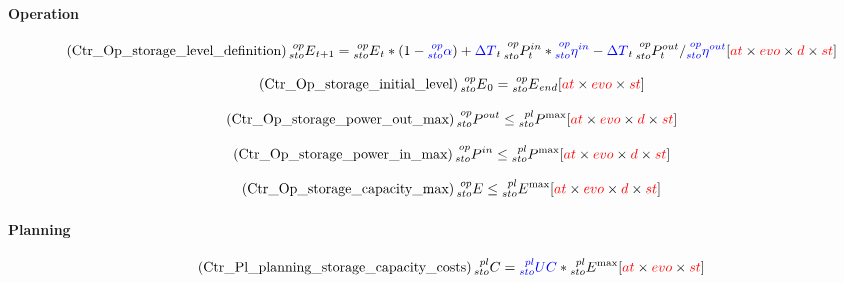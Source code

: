 \documentclass[a4paper,11pt]{article}
\begin{document}
\paragraph{Operation}

\begin{equation} \tag{Ctr\_Op\_storage\_level\_definition}
    \prescript{op}{sto}{E}_{t+1} = \prescript{op}{sto}{E}_{t} * (1-\textcolor{blue}{\prescript{op}{sto}{\alpha}})+ \textcolor{blue}{\Delta T }_t\prescript{op}{sto}{P^{in}_t}*\textcolor{blue}{\prescript{op}{sto}{\eta^{in}}} - \textcolor{blue}{\Delta T }_t\prescript{op}{sto}{P^{out}_t} / \textcolor{blue}{\prescript{op}{sto}{\eta^{out}}} \hfill [\textcolor{red}{at} \times \textcolor{red}{evo} \times \textcolor{red}{d} \times \textcolor{red}{st}]
\label{eq:Ctr_Op_storage_level_definition}
\end{equation}

\begin{equation} \tag{Ctr\_Op\_storage\_initial\_level}
    \prescript{op}{sto}{E}_{0} =  \prescript{op}{sto}{E}_{end} \hfill [\textcolor{red}{at} \times \textcolor{red}{evo} \times \textcolor{red}{st}]
\label{eq:Ctr_Op_storage_initial_level}
\end{equation}

\begin{equation} \tag{Ctr\_Op\_storage\_power\_out\_max}
    \prescript{op}{sto}{P^{out}} \leq \prescript{pl}{sto}{P^{\max}} \hfill [\textcolor{red}{at} \times \textcolor{red}{evo}\times \textcolor{red}{d}  \times \textcolor{red}{st}]
\label{eq:Ctr_Op_storage_power_in_max}
\end{equation}

\begin{equation} \tag{Ctr\_Op\_storage\_power\_in\_max}
    \prescript{op}{sto}{P^{in}} \leq \prescript{pl}{sto}{P^{\max}} \hfill [\textcolor{red}{at} \times \textcolor{red}{evo}\times \textcolor{red}{d}  \times \textcolor{red}{st}]
\label{eq:Ctr_Op_storage_power_out_max}
\end{equation}

\begin{equation} \tag{Ctr\_Op\_storage\_capacity\_max}
    \prescript{op}{sto}{E} \leq \prescript{pl}{sto}{E^{\max}} \hfill [\textcolor{red}{at} \times \textcolor{red}{evo}\times \textcolor{red}{d}  \times \textcolor{red}{st}]
\label{eq:Ctr_Op_storage_capacity_max}
\end{equation}


\paragraph{Planning}
\begin{equation} \tag{Ctr\_Pl\_planning\_storage\_capacity\_costs}
    \prescript{pl}{sto}{C} = \textcolor{blue}{\prescript{pl}{sto}{UC}} *    \prescript{pl}{sto}{E^{\max}} \hfill [\textcolor{red}{at} \times \textcolor{red}{evo} \times \textcolor{red}{st}]
\label{eq:Ctr_Pl_planning_storage_capacity_costs}
\end{equation}
\end{document}
